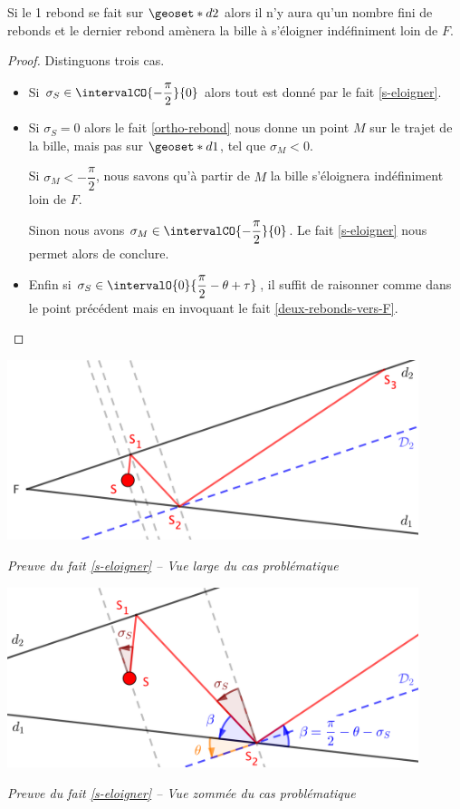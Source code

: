\medskip


\begin{theorem}
	Si le 1\ier{} rebond se fait sur $\geoset*{d}{2}$ alors il n'y aura qu'un nombre fini de rebonds et le dernier rebond amènera la bille à s'éloigner indéfiniment loin de $F$.
\end{theorem}

\begin{proof}
	Distinguons trois cas.
	
	\begin{itemize}[label = \textbullet]
		\item Si $\sigma_S \in \intervalCO{- \dfrac{\pi}{2}}{0}$ alors tout est donné par le fait \ref{s-eloigner}.


		\item Si $\sigma_S = 0$ alors le fait \ref{ortho-rebond} nous donne un point $M$ sur le trajet de la bille, mais pas sur $\geoset*{d}{1}$, tel que $\sigma_M < 0$.
		
		\noindent
		Si $\sigma_M < - \dfrac{\pi}{2}$, nous savons qu'à partir de $M$ la bille s'éloignera indéfiniment loin de $F$.
		
		\noindent
		Sinon nous avons $\sigma_M \in \intervalCO{- \dfrac{\pi}{2}}{0}$.
		Le fait \ref{s-eloigner} nous permet alors de conclure.
		
		
		\item Enfin si $\sigma_S \in \intervalO{0}{\dfrac{\pi}{2} - \theta + \tau}$, il suffit de raisonner comme dans le point précédent mais en invoquant le fait \ref{deux-rebonds-vers-F}.
	\end{itemize}
\end{proof}

	
\medskip


\begin{center}
	\includegraphics[width=12cm]{basic-math-pool/proof-starting-with-d2-2-bounces-farway-from-F.png}

	\itshape\small
	Preuve du fait \ref{s-eloigner} -- Vue large du cas problématique
\end{center}

	
\medskip


\begin{center}
	\includegraphics[width=12cm]{basic-math-pool/proof-starting-with-d2-2-bounces-farway-from-F-zoom.png}

	\itshape\small
	Preuve du fait \ref{s-eloigner} -- Vue zommée du cas problématique
\end{center}

